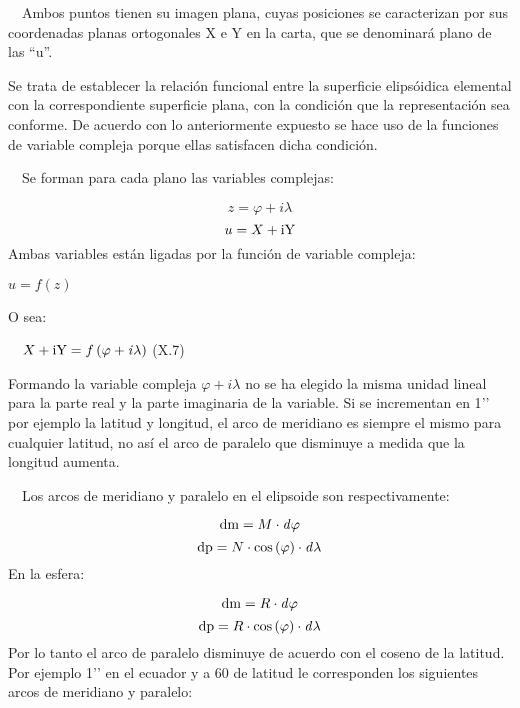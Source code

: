 \documentclass{tufte-book}
\newcommand\normalsubformula[1]{\text{\mathversion{normal}$#1$}}
\begin{document}
\ \ Ambos puntos tienen su imagen plana, cuyas posiciones se
caracterizan por sus coordenadas planas ortogonales X e Y en la carta,
que se denominará plano de las
{\textquotedblleft}u{\textquotedblright}.

Se trata de establecer la relación funcional entre la superficie
elipsóidica elemental con la correspondiente superficie plana, con la
condición que la representación sea conforme. De acuerdo con lo
anteriormente expuesto se hace uso de la funciones de variable compleja
porque ellas satisfacen dicha condición.

\ \ Se forman para cada plano las variables complejas:

\begin{equation*}
{z=\varphi +\mathit{i\lambda }}
\end{equation*}
\begin{equation*}
{u=X+\normalsubformula{\text{iY}}}
\end{equation*}
Ambas variables están ligadas por la función de variable compleja:

 ${u=f\left(z\right)}$

O sea:

\ \  ${X+\normalsubformula{\text{iY}}=f\left(\varphi +\mathit{i\lambda
}\right)}$  (X.7)

Formando la variable compleja  ${\varphi +\mathit{i\lambda }}$ no se ha
elegido la misma unidad lineal para la parte real y la parte imaginaria
de la variable. Si se incrementan en
1{\textquoteright}{\textquoteright} por ejemplo la latitud y longitud,
el arco de meridiano es siempre el mismo para cualquier latitud, no
así el arco de paralelo que disminuye a medida que la longitud
aumenta.

\ \ Los arcos de meridiano y paralelo en el elipsoide son
respectivamente:

\begin{equation*}
{\normalsubformula{\text{dm}}=M\cdot \mathit{d\varphi }}
\end{equation*}
\begin{equation*}
{\normalsubformula{\text{dp}}=N\cdot \text{cos}\left(\varphi
\right)\cdot \mathit{d\lambda }}
\end{equation*}
En la esfera:

\begin{equation*}
{\normalsubformula{\text{dm}}=R\cdot \mathit{d\varphi }}
\end{equation*}
\begin{equation*}
{\normalsubformula{\text{dp}}=R\cdot \text{cos}\left(\varphi
\right)\cdot \mathit{d\lambda }}
\end{equation*}
Por lo tanto el arco de paralelo disminuye de acuerdo con el coseno de
la latitud. Por ejemplo 1{\textquoteright}{\textquoteright} en el
ecuador y a 60{\textdegree} de latitud le corresponden los siguientes
arcos de meridiano y paralelo:
\end{document}
